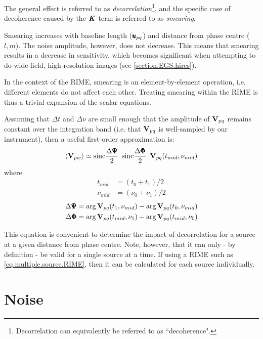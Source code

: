 \pg
The general effect is referred to as \emph{decorrelation}\footnote{Decorrelation can equivalently be referred to as ``decoherence".}, and the specific case of decoherence caused by the $\textbf{\emph{K}}$ term is referred to as \emph{smearing}.

\pg Smearing increases with baseline length ($\pmb{u}_{pq}$) and distance from phase centre ($l,m$). The noise amplitude, however, does not decrease. This means that smearing results in a decrease in sensitivity, which becomes significant when attempting to do wide-field, high-resolution images (see \cref{section.EGS.hires}).

\pg 
In the context of the RIME, smearing is an element-by-element operation, i.e. different elements do not affect each other. Treating smearing within the RIME is thus a trivial expansion of the scalar equations.

\pg
Assuming that $\Delta t$ and $\Delta \nu$ are small enough that the amplitude of $\textbf{V}_{pq}$ remains constant over the integration band (i.e. that $\textbf{V}_{pq}$ is well-sampled by our instrument), then a useful first-order approximation is:
\begin{equation}
\langle \textbf{V}_{pw} \rangle \simeq \text{sinc}\frac{\Delta \pmb{\Psi}}{2} \enskip \text{sinc}\frac{\Delta \pmb{\Phi}}{2} \enskip \textbf{V}_{pq}(t_{mid},\nu_{mid})
\end{equation}
where
\begin{align}
t_{mid}           &= (t_0 + t_1)/2\\
\nu_{mid}         &= (\nu_0 + \nu_1)/2
\end{align}
\begin{align}
\Delta \pmb{\Psi} &= \arg \textbf{V}_{pq}(t_1,\nu_{mid}) - \arg \textbf{V}_{pq}(t_0, \nu_{mid})\\
\Delta \pmb{\Phi} &= \arg \textbf{V}_{pq}(t_{mid},\nu_1) - \arg \textbf{V}_{pq}(t_{mid}, \nu_0)
\end{align}

\pg
This equation is convenient to determine the impact of decorrelation for a source at a given distance from phase centre. Note, however, that it can only - by definition - be valid for a single source at a time. If using a RIME such as \cref{eq.multiple.source.RIME}, then it can be calculated for each source individually.

\section{Noise}
\label{section.RIME.noise}

